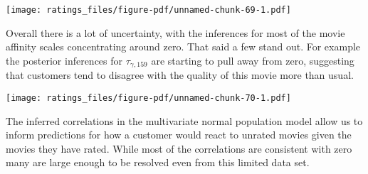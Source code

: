 \documentclass[
  letterpaper,
  DIV=11,
  numbers=noendperiod]{scrartcl}
\newenvironment{Shaded}{\begin{snugshade}}{\end{snugshade}}
\newcommand{\AttributeTok}[1]{\textcolor[rgb]{0.40,0.45,0.13}{#1}}
\newcommand{\DecValTok}[1]{\textcolor[rgb]{0.68,0.00,0.00}{#1}}
\newcommand{\FloatTok}[1]{\textcolor[rgb]{0.68,0.00,0.00}{#1}}
\newcommand{\FunctionTok}[1]{\textcolor[rgb]{0.28,0.35,0.67}{#1}}
\newcommand{\NormalTok}[1]{\textcolor[rgb]{0.00,0.23,0.31}{#1}}
\newcommand{\OtherTok}[1]{\textcolor[rgb]{0.00,0.23,0.31}{#1}}
\newcommand{\SpecialCharTok}[1]{\textcolor[rgb]{0.37,0.37,0.37}{#1}}
\newcommand{\StringTok}[1]{\textcolor[rgb]{0.13,0.47,0.30}{#1}}
\begin{document}
\texttt{[image: ratings\_files/figure-pdf/unnamed-chunk-69-1.pdf]}

Overall there is a lot of uncertainty, with the inferences for most of
the movie affinity scales concentrating around zero. That said a few
stand out. For example the posterior inferences for
\(\tau_{\gamma, 159}\) are starting to pull away from zero, suggesting
that customers tend to disagree with the quality of this movie more than
usual.

\begin{Shaded}
\end{Shaded}

\texttt{[image: ratings\_files/figure-pdf/unnamed-chunk-70-1.pdf]}

The inferred correlations in the multivariate normal population model
allow us to inform predictions for how a customer would react to unrated
movies given the movies they have rated. While most of the correlations
are consistent with zero many are large enough to be resolved even from
this limited data set.

\begin{Shaded}
\end{Shaded}
\end{document}
